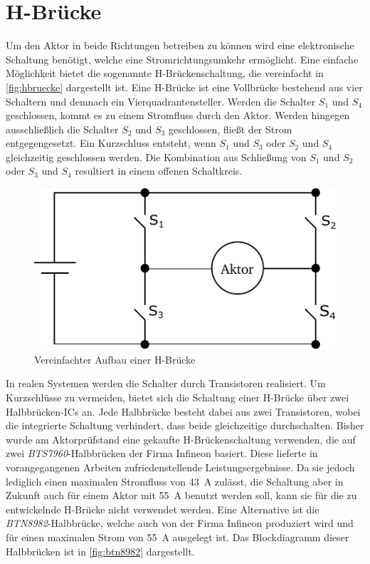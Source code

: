\section{H-Brücke}\label{sec:hbridge}
Um den Aktor in beide Richtungen  betreiben zu können wird eine elektronische Schaltung benötigt, welche eine Stromrichtungsumkehr ermöglicht. Eine einfache Möglichkeit bietet die sogenannte H-Brückenschaltung, die vereinfacht in \autoref{fig:hbruecke} dargestellt ist. Eine H-Brücke ist eine Vollbrücke bestehend aus vier Schaltern und demnach ein Vierquadrantensteller. Werden die Schalter $S_1$ und $S_4$ geschlossen, kommt es zu einem Stromfluss durch den Aktor. Werden hingegen ausschließlich die Schalter $S_2$ und $S_3$ geschlossen, fließt der Strom entgegengesetzt. Ein Kurzschluss entsteht, wenn $S_1$ und $S_3$ oder $S_2$ und $S_4$ gleichzeitig geschlossen werden. Die Kombination aus Schließung von $S_1$ und $S_2$ oder $S_3$ und $S_4$ resultiert in einem offenen Schaltkreis. \\
\begin{figure} [H]
	\centering
	\includegraphics[width=0.3\linewidth]{Bilder/hbruecke.pdf}
	\caption{Vereinfachter Aufbau einer H-Brücke}
	\label{fig:hbruecke}
\end{figure}\noindent
In realen Systemen werden die Schalter durch Transistoren realisiert. Um Kurzschlüsse zu vermeiden, bietet sich die Schaltung einer H-Brücke über zwei Halbbrücken-ICs an. Jede Halbbrücke besteht dabei aus zwei Transistoren, wobei die integrierte Schaltung verhindert, dass beide gleichzeitige durchschalten. Bisher wurde am Aktorprüfstand eine gekaufte H-Brückenschaltung verwenden, die auf zwei \textit{BTS7960}-Halbbrücken der Firma Infineon basiert. Diese lieferte in vorangegangenen Arbeiten zufriedenstellende Leistungsergebnisse. Da sie jedoch  lediglich einen maximalen Stromfluss von \SI{43}{A} zulässt, die Schaltung aber in Zukunft auch für einem Aktor mit \SI{55}{A} benutzt werden soll, kann sie für die zu entwickelnde H-Brücke nicht verwendet werden. Eine Alternative ist die \textit{BTN8982}-Halbbrücke, welche auch von der Firma Infineon produziert wird und für einen maximalen Strom von \SI{55}{A} ausgelegt ist. Das Blockdiagramm dieser Halbbrücken ist in \autoref{fig:btn8982} dargestellt. \\
